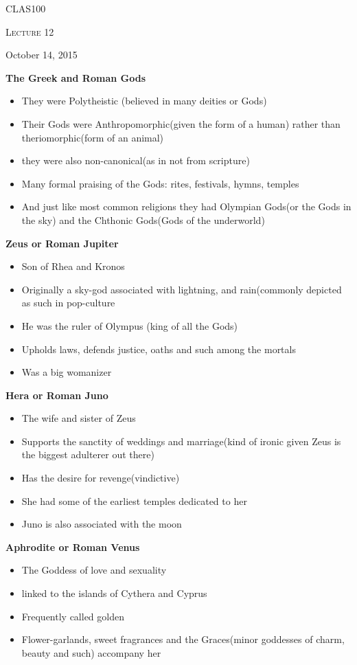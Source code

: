 \documentclass[12pt,a4paper]{report}
\begin{document}
	\centering
	{\scshape\LARGE CLAS100 \par}
	{\scshape\Large Lecture 12\par}
	{\large October 14, 2015}
	\vspace{1.5cm}

\textbf{The Greek and Roman Gods}
\begin{itemize}
\item They were Polytheistic (believed in many deities or Gods)
\item Their Gods were Anthropomorphic(given the form of a human) rather than theriomorphic(form of an animal)
\item they were also non-canonical(as in not from scripture)
\item Many formal praising of the Gods: rites, festivals, hymns, temples
\item And just like most common religions they had Olympian Gods(or the Gods in the sky) and the Chthonic Gods(Gods of the underworld)
\end{itemize}

\textbf{Zeus or Roman Jupiter}
\begin{itemize}
\item Son of Rhea and Kronos
\item Originally a sky-god associated with lightning, and rain(commonly depicted as such in pop-culture
\item He was the ruler of Olympus (king of all the Gods)
\item Upholds laws, defends justice, oaths and such among the mortals
\item Was a big womanizer
\end{itemize}

\textbf{Hera or Roman Juno}
\begin{itemize}
\item The wife and sister of Zeus
\item Supports the sanctity of weddings and marriage(kind of ironic given Zeus is the biggest adulterer out there)
\item Has the desire for revenge(vindictive)
\item She had some of the earliest temples dedicated to her
\item Juno is also associated with the moon
\end{itemize}

\textbf{Aphrodite or Roman Venus}
\begin{itemize}
\item The Goddess of love and sexuality
\item linked to the islands of Cythera and Cyprus
\item Frequently called golden
\item Flower-garlands, sweet fragrances and the Graces(minor goddesses of charm, beauty and such) accompany her
\end{itemize}
\end{document}
